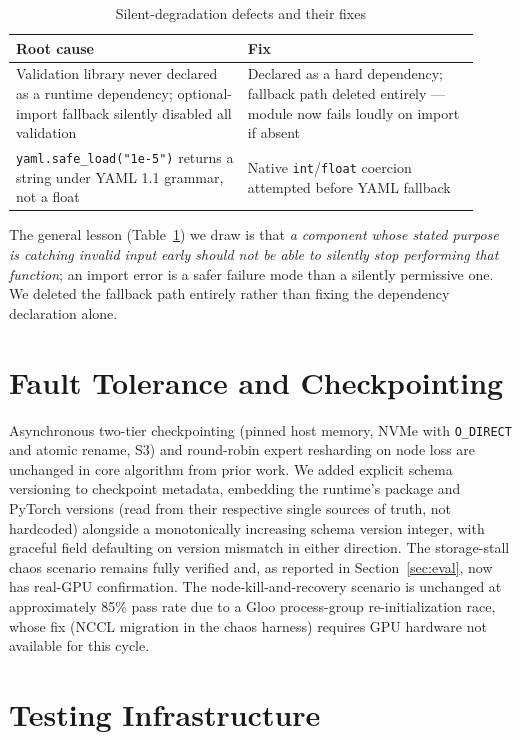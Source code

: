 \documentclass[conference]{IEEEtran}
\begin{document}
\begin{table}[t]
\centering
\caption{Silent-degradation defects and their fixes}
\label{tab:bugs}
\small
\begin{tabular}{@{}p{0.46\linewidth}p{0.46\linewidth}@{}}
\toprule
\textbf{Root cause} & \textbf{Fix} \\
\midrule
Validation library never declared as a runtime dependency; optional-import fallback silently disabled all validation & Declared as a hard dependency; fallback path deleted entirely --- module now fails loudly on import if absent \\
\addlinespace
\texttt{yaml.safe\_load("1e-5")} returns a string under YAML 1.1 grammar, not a float & Native \texttt{int}/\texttt{float} coercion attempted before YAML fallback \\
\bottomrule
\end{tabular}
\end{table}

The general lesson (Table~\ref{tab:bugs}) we draw is that \emph{a component
whose stated purpose is catching invalid input early should not be able to
silently stop performing that function}; an import error is a safer
failure mode than a silently permissive one. We deleted the fallback path
entirely rather than fixing the dependency declaration alone.

\section{Fault Tolerance and Checkpointing}

Asynchronous two-tier checkpointing (pinned host memory, NVMe with
\texttt{O\_DIRECT} and atomic rename, S3) and round-robin expert resharding
on node loss are unchanged in core algorithm from prior work. We added
explicit schema versioning to checkpoint metadata, embedding the runtime's
package and PyTorch versions (read from their respective single sources of
truth, not hardcoded) alongside a monotonically increasing schema version
integer, with graceful field defaulting on version mismatch in either
direction. The storage-stall chaos scenario remains fully verified and, as
reported in Section~\ref{sec:eval}, now has real-GPU confirmation. The
node-kill-and-recovery scenario is unchanged at approximately 85\% pass
rate due to a Gloo process-group re-initialization race, whose fix (NCCL
migration in the chaos harness) requires GPU hardware not available for
this cycle.

\section{Testing Infrastructure}
\label{sec:testing}
\end{document}
